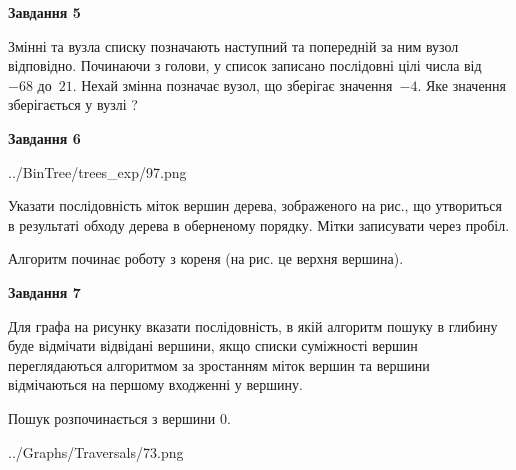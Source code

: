 \documentclass[12pt, ukrainian]{article}
\begin{document}
{\begin {large}
{\begin {center}\textbf{Завдання 5}\end {center}}\par
Змінні  та  вузла списку позначають наступний та попередній за ним вузол відповідно. Починаючи з голови, у список записано послідовні цілі числа від~$-68$ до~$21$. Нехай змінна  позначає вузол, що зберігає значення~$-4$.
Яке значення зберігається у вузлі  ?\par
\newpage

{\begin {center}\textbf{Завдання 6}\end {center}}\par

\begin{center}
	{../BinTree/trees_exp/97.png}
\end{center}
Указати послідовність міток вершин дерева, зображеного на рис., що утвориться в результаті обходу дерева в оберненому порядку. Мітки записувати через пробіл.\par Алгоритм починає роботу з кореня (на рис. це верхня вершина).\par
\newpage

{\begin {center}\textbf{Завдання 7}\end {center}}\par
Для графа на рисунку вказати послідовність, в якій алгоритм пошуку в глибину буде відмічати відвідані вершини, якщо списки суміжності вершин переглядаються алгоритмом за зростанням міток вершин та вершини відмічаються на першому вход\-женні у вершину.\par
Пошук розпочинається з вершини 0.\par

\begin{center}
	{../Graphs/Traversals/73.png}
\end{center}\par
\newpage


\end{large}}
\end{document}
